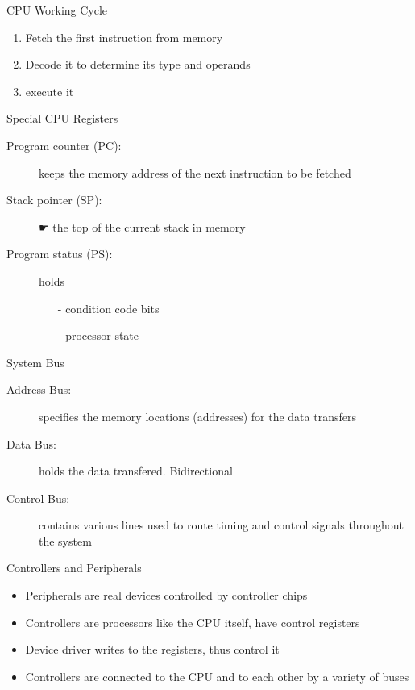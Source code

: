 \begin{frame}{CPU Working Cycle}
  \begin{center}
  \end{center}
  \begin{enumerate}
  \item Fetch the first instruction from memory
  \item Decode it to determine its type and operands
  \item execute it
  \end{enumerate}
  \begin{block}{Special CPU Registers}
    \begin{description}
    \item[Program counter (PC):] keeps the memory address of the next instruction to
      be fetched
    \item[Stack pointer (SP):] {\symbola ☛} the top of the current stack in memory
    \item[Program status (PS):] holds
      \begin{itemize}
      \item[-] condition code bits
      \item[-] processor state
      \end{itemize}
    \end{description}
  \end{block}
\end{frame}

\begin{frame}{System Bus}
  \begin{center}
  \end{center}
  \begin{description}
  \item[Address Bus:] specifies the memory locations (addresses) for the
    data transfers
  \item[Data Bus:] holds the data transfered. Bidirectional
  \item[Control Bus:] contains various lines used to route timing and
    control signals throughout the system
  \end{description}
\end{frame}

\begin{frame}{Controllers and Peripherals}
  \begin{itemize}
  \item Peripherals are real devices controlled by controller chips
  \item Controllers are processors like the CPU itself, have control registers
  \item Device driver writes to the registers, thus control it
  \item Controllers are connected to the CPU and to each other by a variety of buses
  \end{itemize}
\end{frame}


